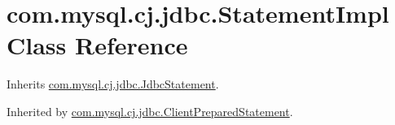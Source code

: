 \hypertarget{classcom_1_1mysql_1_1cj_1_1jdbc_1_1_statement_impl}{}\section{com.\+mysql.\+cj.\+jdbc.\+Statement\+Impl Class Reference}
\label{classcom_1_1mysql_1_1cj_1_1jdbc_1_1_statement_impl}


Inherits \mbox{\hyperlink{interfacecom_1_1mysql_1_1cj_1_1jdbc_1_1_jdbc_statement}{com.\+mysql.\+cj.\+jdbc.\+Jdbc\+Statement}}.



Inherited by \mbox{\hyperlink{classcom_1_1mysql_1_1cj_1_1jdbc_1_1_client_prepared_statement}{com.\+mysql.\+cj.\+jdbc.\+Client\+Prepared\+Statement}}.

